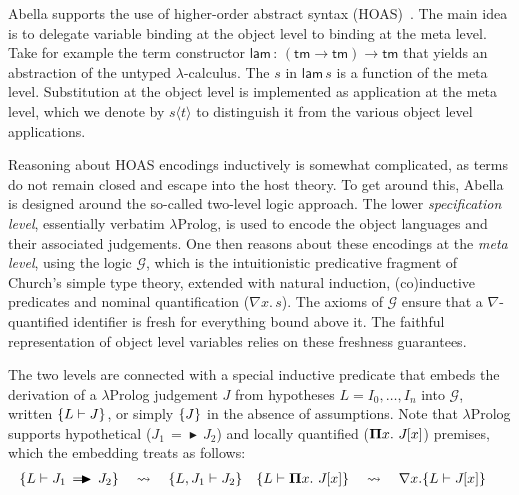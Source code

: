 \documentclass[a4paper,UKenglish]{lipics-v2016}
\newcommand{\ms}{\,}
\newcommand{\mrel}[1]{\mathrel{\ms #1 \ms}}
\newcommand{\OF}{\mrel{:}}
\newcommand{\lpPi}[1]{\mathbf{\Pi} #1.\ms\ms}
\newcommand{\lpApp}[2]{#1\langle#2\rangle}
\newcommand{\lpImp}{\mrel{=\!\blacktriangleright}}
\newcommand{\subst}[1]{\hphantom{|}\!\![{#1}]}
\theoremstyle{plain}
\begin{document}

Abella supports the use of higher-order abstract syntax (HOAS)~\cite{DBLP:conf/pldi/PfenningE88}.
The main idea is to delegate variable binding at the object level to binding at the meta level.
Take for example the term constructor $\mathsf{lam} \OF (\mathsf{tm} \to \mathsf{tm}) \to \mathsf{tm}$ that yields an abstraction of the untyped $\lambda$-calculus.
The $s$ in $\mathsf{lam}\,s$ is a function of the meta level.
Substitution at the object level is implemented as application at the meta level, which we denote by $\lpApp{s}{t}$ to distinguish it from the various object level applications.

Reasoning about HOAS encodings inductively is somewhat complicated, as terms do not remain closed and escape into the host theory.
To get around this, Abella is designed around the so-called two-level logic approach.
The lower \emph{specification level}, essentially verbatim $\lambda$Prolog, is used to encode the object languages and their associated judgements.
One then reasons about these encodings at the \emph{meta level}, using the logic $\mathcal{G}$, which is the intuitionistic predicative fragment of Church's simple type theory, extended with natural induction, (co)inductive predicates and nominal quantification ($\nabla x . \ms s$).
The axioms of $\mathcal{G}$ ensure that a $\nabla$-quantified identifier is fresh for everything bound above it.
The faithful representation of object level variables relies on these freshness guarantees.

The two levels are connected with a special inductive predicate that embeds the derivation of a $\lambda$Prolog judgement $J$ from hypotheses $L = I_0,\ldots,I_n$ into $\mathcal{G}$, written $\{L \vdash J\}$, or simply $\{J\}$ in the absence of assumptions.
Note that $\lambda$Prolog supports hypothetical ($J_1 \lpImp J_2$) and locally quantified ($\lpPi{x} J\subst{x}$) premises, which the embedding treats as follows:
\begin{align*}
  \aj{L}{J_1 \lpImp J_2} &\quad\leadsto\quad \aj{L, J_1}{J_2} & \aj{L}{\lpPi{x} J\subst{x}}&\quad\leadsto\quad \nabla x. \aj{L}{J\subst{x}}
\end{align*}
\end{document}

